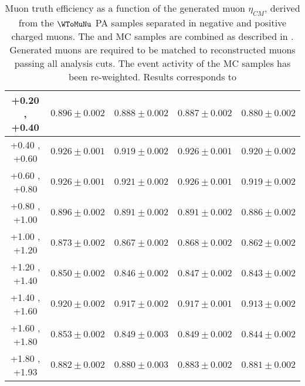 \begin{table}[h!]
{\begin{tabular}{|c|*4c|}
    \hline
    +0.20 , +0.40 & $0.896 \pm 0.002$ & $0.888 \pm 0.002$ & $0.887 \pm 0.002$ & $0.880 \pm 0.002$\\
    \hline
    +0.40 , +0.60 & $0.926 \pm 0.001$ & $0.919 \pm 0.002$ & $0.926 \pm 0.001$ & $0.920 \pm 0.002$\\
    \hline
    +0.60 , +0.80 & $0.926 \pm 0.001$ & $0.921 \pm 0.002$ & $0.926 \pm 0.001$ & $0.919 \pm 0.002$\\
    \hline
    +0.80 , +1.00 & $0.896 \pm 0.002$ & $0.891 \pm 0.002$ & $0.891 \pm 0.002$ & $0.886 \pm 0.002$\\
    \hline
    +1.00 , +1.20 & $0.873 \pm 0.002$ & $0.867 \pm 0.002$ & $0.868 \pm 0.002$ & $0.862 \pm 0.002$\\
    \hline
    +1.20 , +1.40 & $0.850 \pm 0.002$ & $0.846 \pm 0.002$ & $0.847 \pm 0.002$ & $0.843 \pm 0.002$\\
    \hline
    +1.40 , +1.60 & $0.920 \pm 0.002$ & $0.917 \pm 0.002$ & $0.917 \pm 0.001$ & $0.913 \pm 0.002$\\
    \hline
    +1.60 , +1.80 & $0.853 \pm 0.002$ & $0.849 \pm 0.003$ & $0.849 \pm 0.002$ & $0.844 \pm 0.002$\\
    \hline
    +1.80 , +1.93 & $0.882 \pm 0.002$ & $0.880 \pm 0.003$ & $0.883 \pm 0.002$ & $0.881 \pm 0.002$\\
    \hline
  \end{tabular}
  }
  \caption{Muon truth efficiency as a function of the generated muon $\eta_{CM}$, derived from the $\WToMuNu$ PA \POWHEG samples separated in negative and positive charged muons. The \pPb and \Pbp MC samples are combined as described in . Generated muons are required to be matched to reconstructed muons passing all analysis cuts. The event activity of the MC samples has been re-weighted. Results corresponds to }
  \label{tab:mcEfficiency_WToMu_PA}
\end{table}


